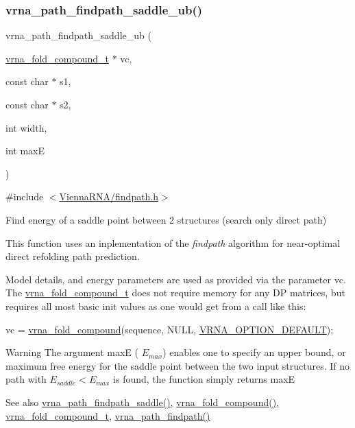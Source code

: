 \subsubsection{\texorpdfstring{vrna\+\_\+path\+\_\+findpath\+\_\+saddle\+\_\+ub()}{vrna\_path\_findpath\_saddle\_ub()}}
{\footnotesize\ttfamily vrna\+\_\+path\+\_\+findpath\+\_\+saddle\+\_\+ub (\begin{DoxyParamCaption}\item[{\hyperlink{group__fold__compound_ga1b0cef17fd40466cef5968eaeeff6166}{vrna\+\_\+fold\+\_\+compound\+\_\+t} $\ast$}]{vc,  }\item[{const char $\ast$}]{s1,  }\item[{const char $\ast$}]{s2,  }\item[{int}]{width,  }\item[{int}]{maxE }\end{DoxyParamCaption})}



{\ttfamily \#include $<$\hyperlink{findpath_8h}{Vienna\+R\+N\+A/findpath.\+h}$>$}



Find energy of a saddle point between 2 structures (search only direct path) 

This function uses an inplementation of the {\itshape findpath} algorithm \cite{flamm:2001} for near-\/optimal direct refolding path prediction.

Model details, and energy parameters are used as provided via the parameter \textquotesingle{}vc\textquotesingle{}. The \hyperlink{group__fold__compound_ga1b0cef17fd40466cef5968eaeeff6166}{vrna\+\_\+fold\+\_\+compound\+\_\+t} does not require memory for any DP matrices, but requires all most basic init values as one would get from a call like this\+: 
\begin{DoxyCode}
vc = \hyperlink{group__fold__compound_ga6601d994ba32b11511b36f68b08403be}{vrna\_fold\_compound}(sequence, NULL, \hyperlink{group__fold__compound_gacea5b7ee6181c485f36e2afa0e9089e4}{VRNA\_OPTION\_DEFAULT});
\end{DoxyCode}


\begin{DoxyWarning}{Warning}
The argument {\ttfamily maxE} ( $E_{max}$) enables one to specify an upper bound, or maximum free energy for the saddle point between the two input structures. If no path with $E_{saddle} < E_{max}$ is found, the function simply returns {\ttfamily maxE} 
\end{DoxyWarning}
\begin{DoxySeeAlso}{See also}
\hyperlink{group__direct__paths_gad611574a76593e26021f177e7854b6b4}{vrna\+\_\+path\+\_\+findpath\+\_\+saddle()}, \hyperlink{group__fold__compound_ga6601d994ba32b11511b36f68b08403be}{vrna\+\_\+fold\+\_\+compound()}, \hyperlink{group__fold__compound_ga1b0cef17fd40466cef5968eaeeff6166}{vrna\+\_\+fold\+\_\+compound\+\_\+t}, \hyperlink{group__direct__paths_ga4b2283c4142cafd99678495585fcc842}{vrna\+\_\+path\+\_\+findpath()}
\end{DoxySeeAlso}

